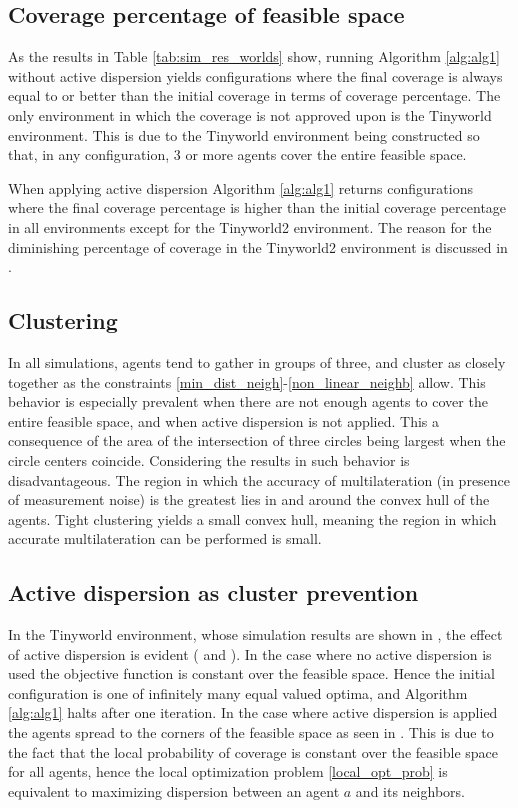 \subsection{Coverage percentage of feasible space}
As the results in Table \ref{tab:sim_res_worlds} show, running Algorithm \ref{alg:alg1} without active dispersion yields configurations where the 
final coverage is always equal to or better than the initial coverage in terms of coverage percentage. The only environment in which the coverage is not approved upon is the Tinyworld environment.
This is due to the Tinyworld environment being constructed so that, in any configuration, 3 or more agents cover the entire feasible space.

When applying active dispersion Algorithm \ref{alg:alg1} returns configurations where the final coverage percentage is higher than the initial coverage percentage in all environments
except for the Tinyworld2 environment. The reason for the diminishing percentage of coverage in the Tinyworld2 environment is discussed in .

\subsection{Clustering}
In all simulations, agents tend to gather in groups of three, and cluster as closely together as the constraints \eqref{min_dist_neigh}-\eqref{non_linear_neighb} allow.  
This behavior is especially prevalent when there are not enough agents to cover the entire feasible space, and when active dispersion is not applied. This a consequence 
of the area of the intersection of three circles being largest when the circle centers coincide. Considering the results in \cite{CRB_multilat} such behavior is disadvantageous. The region in which
the accuracy of multilateration (in presence of measurement noise) is the greatest lies in and around the convex hull of the agents. Tight clustering yields a small convex hull, 
meaning the region in which accurate multilateration can be performed is small.


\subsection{Active dispersion as cluster prevention}
In the Tinyworld environment, whose simulation results are shown in , the effect of active dispersion is evident ( and ). 
In the case where no active dispersion is used the objective function is constant over the feasible space. Hence the initial configuration is one of 
infinitely many equal valued optima, and Algorithm \ref{alg:alg1} halts after one iteration. In the case where active dispersion is applied the agents spread to the corners of the
feasible space as seen in . This is due to the fact that the local probability of coverage is constant over the feasible space for all agents, hence the 
local optimization problem \eqref{local_opt_prob} is equivalent to maximizing dispersion between an agent $a$ and its neighbors. 

